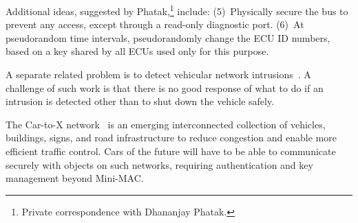 Additional ideas, suggested by Phatak,\footnote{Private correspondence with Dhananjay Phatak.} 
include:
(5)~Physically secure the bus to prevent any access, except through
a read-only diagnostic port.
(6)~At pseudorandom time intervals, pseudorandomly change the ECU ID numbers, 
based on a key shared by all ECUs used only for this purpose.

A separate related problem is to detect vehicular network intrusions~\cite{Otsuka2014}. A challenge of such work is that
there is no good response of what to do if an intrusion is detected other than to shut down the vehicle safely.

The Car-to-X network~\cite{C2X} is an emerging interconnected collection of vehicles, buildings, signs, and road infrastructure 
to reduce congestion and enable more efficient traffic control. Cars of the future will have to be able to communicate
securely with objects on such networks, requiring authentication and key management beyond Mini-MAC.

